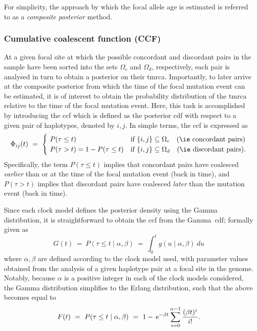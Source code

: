 For simplicity, the approach by which the focal allele age is estimated is referred to as a \emph{composite posterior} method.

%
\subsubsection{Cumulative coalescent function (CCF)}\label{sec:ccf_desc}
%

At a given focal site at which the possible concordant and discordant pairs in the sample have been sorted into the sets $\Omega_c$ and $\Omega_d$, respectively, each pair is analysed in turn to obtain a posterior on their \gls{tmrca}.
Importantly, to later arrive at the composite posterior from which the time of the focal mutation event can be estimated, it is of interest to obtain the probability distribution of the \gls{tmrca} relative to the time of the focal mutation event.
Here, this task is accomplished by introducing the \gls{ccf} which is defined as the posterior \gls{cdf} with respect to a given pair of haplotypes, denoted by ${i,j}$.
In simple terms, the \gls{ccf} is expressed as
\begin{equation}\label{eq:cumcoalfunc}
	\Phi_{ij}(t)~=~
	\begin{cases}
    ~ P(\tau \leq t)                  & \text{if}~{\{i,j\} \subseteq \Omega_c}\quad\text{(\ie concordant pairs)} \\
    ~ P(\tau >    t)=1-P(\tau \leq t) & \text{if}~{\{i,j\} \subseteq \Omega_d}\quad\text{(\ie discordant pairs)}\text{.}
  \end{cases}
\end{equation}
Specifically, the term ${P(\tau \leq t)}$ implies that concordant pairs have coalesced \emph{earlier} than or at the time of the focal mutation event (back in time), and ${P(\tau >t)}$ implies that discordant pairs have coalesced \emph{later} than the mutation event (back in time).

Since each clock model defines the posterior density using the Gamma distribution, it is straightforward to obtain the \gls{ccf} from the Gamma~\gls{cdf}; formally given as
\begin{equation}
	G(t)~=~P(\tau \leq t \mid\alpha,\beta)~=~\int_{0}^{t}g(u\mid\alpha,\beta)~du
\end{equation}
where $\alpha,\beta$ are defined according to the clock model used, with parameter values obtained from the analysis of a given haplotype pair at a focal site in the genome.
Notably, because $\alpha$ is a positive integer in each of the clock models considered, the Gamma distribution simplifies to the Erlang distribution, such that the above becomes equal to \citep{papoulis2002probability}
\begin{equation}
	F(t)~=~P(\tau \leq t \mid\alpha,\beta)~=~1-\,\mathrm{e}^{-\beta t}\sum_{i=0}^{\alpha-1}\frac{(\beta t)^i}{i!}\text{.}
\end{equation}

